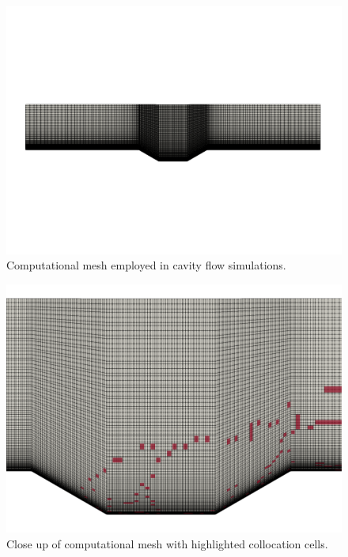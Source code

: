\begin{figure}
\begin{center}
\includegraphics[trim={0cm 14cm 0cm 14cm},clip,width=1.\linewidth]{figs/cavity/grid.png}
\caption{Computational mesh employed in cavity flow simulations.}
\label{fig:cav_mesh}
\end{center}
\end{figure}

\begin{figure} 
\begin{center}
\includegraphics[trim={0cm 0cm 0cm 0cm},clip,width=0.65\linewidth]{figs/cavity/hyper_grid.png}
\caption{Close up of computational mesh with highlighted collocation cells.} 
\label{fig:cav_sampmesh}
\end{center}
\end{figure}

